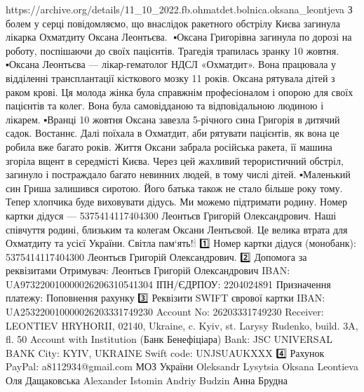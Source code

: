 https://archive.org/details/11_10_2022.fb.ohmatdet.bolnica.oksana_leontjeva
З болем у серці повідомляємо, що внаслідок ракетного обстрілу Києва загинула лікарка Охматдиту Оксана Леонтьєва.🙏
▪️Оксана Григорівна загинула по дорозі на роботу, поспішаючи до своїх пацієнтів. Трагедія трапилась зранку 10 жовтня.
▪️Оксана Леонтьєва — лікар-гематолог НДСЛ «Охматдит». Вона працювала у відділенні трансплантації кісткового мозку 11 років. Оксана рятувала дітей з раком крові. Ця молода жінка була справжнім професіоналом і опорою для своїх пацієнтів та колег. Вона була самовідданою та відповідальною людиною і лікарем.
▪️Вранці 10 жовтня Оксана завезла 5-річного сина Григорія в дитячий садок. Востаннє. Далі поїхала в Охматдит, аби рятувати пацієнтів, як вона це робила вже багато років. Життя Оксани забрала російська ракета, її машина згоріла вщент в середмісті Києва. Через цей жахливий терористичний обстріл, загинуло і постраждало багато невинних людей, в тому числі дітей.
▪️Маленький син Гриша залишився сиротою. Його батька також не стало більше року тому. Тепер хлопчика буде виховувати дідусь. Ми можемо підтримати родину. Номер картки дідуся — 5375414117404300 Леонтьєв Григорій Олександрович.
Наші співчуття родині, близьким та колегам Оксани Лентьєвой. Це велика втрата для Охматдиту та усієї України.
Світла пам‘ять!🕯
1️⃣ Номер картки дідуся (монобанк): 5375414117404300
Леонтьєв Григорій Олександрович.
2️⃣ Допомога за реквізитами
Отримувач: Леонтьєв Григорій Олександрович
IBAN: UA973220010000026206310541304
ІПН/ЄДРПОУ: 2204024891
Призначення платежу: Поповнення рахунку
3️⃣ Реквізити SWIFT єврової картки
IBAN: UA253220010000026203331749230
Account No: 26203331749230
Receiver: LEONTIEV HRYHORII, 02140, Ukraine, c. Kyiv, st. Larysy Rudenko, build. 3A, fl. 50
Account with Institution (Банк Бенефіціара)
Bank: JSC UNIVERSAL BANK
City: KYIV, UKRAINE
Swift code: UNJSUAUKXXX
4️⃣ Рахунок PayPal: a8112934@gmail.com
МОЗ України Oleksandr Lysytsia Oksana Leontieva Оля Дащаковська Alexander Istomin Andriy Budzin Анна Брудна
